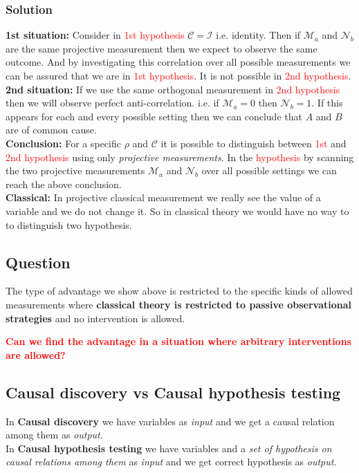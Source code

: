 \documentclass[a4paper,11pt]{article}
\begin{document}
\subsubsection{Solution}
\textbf{1st situation:} Consider in \textcolor{red}{1st hypothesis} $\mathcal{C}=\mathcal{I}$ i.e. identity. Then if $\mathcal{M}_a$ and $\mathcal{N}_b$ are the same projective measurement then we expect to observe the same outcome. And by investigating this correlation over all possible measurements we can be assured that we are in \textcolor{red}{1st hypothesis}. It is not possible in \textcolor{red}{2nd hypothesis}.
\\

\noindent\textbf{2nd situation:} If we use the same orthogonal measurement in \textcolor{red}{2nd hypothesis} then we will observe perfect anti-correlation. i.e. if $\mathcal{M}_a=0$ then $\mathcal{N}_b=1$. If this appears for each and every possible setting then we can conclude that $A$ and $B$ are of common cause.
\\

\noindent \textbf{Conclusion:} For a specific $\rho$ and $\mathcal{C}$ it is possible to distinguish between \textcolor{red}{1st} and \textcolor{red}{2nd hypothesis} using only \textit{projective measurements}.
In the \textcolor{red}{hypothesis} by scanning the two projective measurements $\mathcal{M}_a$ and $\mathcal{N}_b$ over all possible settings we can reach the above conclusion.
\\

\noindent\textbf{Classical:} In projective classical measurement we really see the value of a variable and we do not change it. So in classical theory we would have no way to to distinguish two hypothesis.

\subsection{Question}
The type of advantage we show above is restricted to the specific kinds of allowed measurements where \textbf{classical theory is restricted to passive observational strategies} and no intervention is allowed.

\noindent\textbf{\textcolor{red}{Can we find the advantage in a situation where arbitrary interventions are allowed?}}

\subsection{Causal discovery vs Causal hypothesis testing}
In \textbf{Causal discovery} we have variables as \textit{input} and we get a causal relation among them as \textit{output}.
\\
\noindent In \textbf{Causal hypothesis testing} we have variables and a \textit{set of hypothesis on causal relations among them} as \textit{input} and we get correct hypothesis as \textit{output}.
\end{document}
